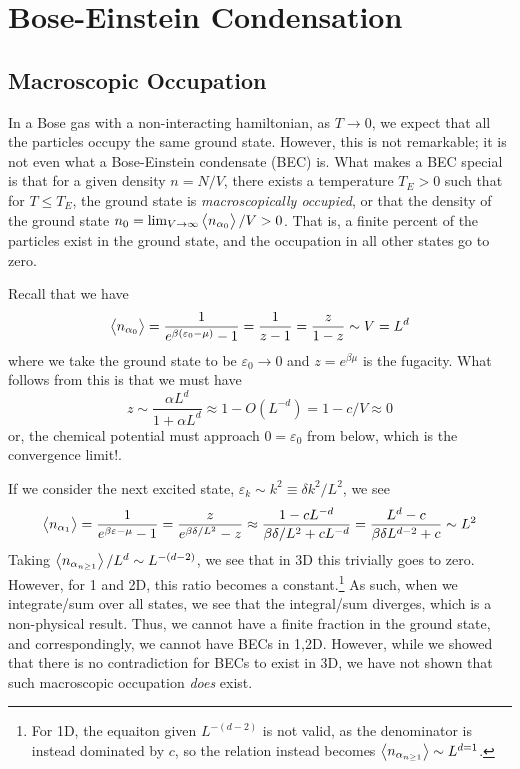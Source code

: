 \chapter{Bose-Einstein Condensation}
\section{Macroscopic Occupation}
In a Bose gas with a non-interacting hamiltonian, as \(T\to 0\), we expect that all the particles occupy the same ground state. However, this is not remarkable; it is not even what a Bose-Einstein condensate (BEC) is. What makes a BEC special is that for a given density \(n=N/V\), there exists a temperature \(T_E>0\) such that for \(T\leq T_E\), the ground state is \emph{macroscopically occupied}, or that the density of the ground state \(n_0 = \lim_{V\rightarrow\infty}\left\langle \begin{matrix}n_{\alpha_0}\end{matrix} \right\rangle/V>0\). That is, a finite percent of the particles exist in the ground state, and the occupation in all other states go to zero.

Recall that we have
\begin{equation}
	\left\langle \begin{matrix}n_{\alpha_0}\end{matrix} \right\rangle = \frac{1}{e^{\beta(\varepsilon_0-\mu)}-1} = \frac{1}{z-1}= \frac{z}{1-z}\sim V = L^d 
\end{equation}
where we take the ground state to be \(\varepsilon_0\to 0\) and \(z=e^{\beta\mu}\) is the fugacity. What follows from this is that we must have
\[z\sim\frac{\alpha L^d}{1+\alpha L^d} \approx 1-O(L^{-d}) = 1-c/V\approx 0\]
or, the chemical potential must approach \(0=\varepsilon_0\) from below, which is the convergence limit!.

If we consider the next excited state, \(\varepsilon_k\sim k^2 \equiv \delta k^2/L^2\), we see
\[\left\langle \begin{matrix}n_{\alpha_1}\end{matrix} \right\rangle = \frac{1}{e^{\beta\varepsilon-\mu}-1} = \frac{z}{e^{\beta \delta/L^2}-z}\approx  \frac{1-cL^{-d}}{\beta\delta/L^2+cL^{-d}} = \frac{L^d-c}{\beta\delta L^{d-2}+c}\sim L^2\]
Taking \(\left\langle \begin{matrix}n_{\alpha_{n\geq 1}}\end{matrix} \right\rangle/L^d\sim L^{-(d-2)}\), we see that in 3D this trivially goes to zero. However, for 1 and 2D, this ratio becomes a constant.\footnote{For 1D, the equaiton given \(L^{-(d-2)}\) is not valid, as the denominator is instead dominated by \(c\), so the relation instead becomes \(\left\langle \begin{matrix}n_{\alpha_{n\geq1}}\end{matrix} \right\rangle\sim L^{d=1}\).}
As such, when we integrate/sum over all states, we see that the integral/sum diverges, which is a non-physical result. Thus, we cannot have a finite fraction in the ground state, and correspondingly, we cannot have BECs in 1,2D. However, while we showed that there is no contradiction for BECs to exist in 3D, we have not shown that such macroscopic occupation \emph{does} exist.

